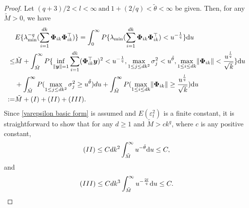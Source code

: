\documentclass[ejsv2]{imsart}
\theoremstyle{plain}
\theoremstyle{definition}
\theoremstyle{remark}
\begin{document}
\begin{proof}
Let $(q+3)/2<l<\infty\ \textrm{and}\ 1+(2/q)<\tilde{\theta}<\infty$ 
be given. Then, for any $\tilde{M}>0$, we have
\begin{equation}\label{pt.fisher.3}
\begin{split}
     & E\{\lambda_{\min}^{-q}(\sum_{i=1}^{dk}\bm{\Phi}_{ik}\bm{\Phi}_{ik}^\top)\} =   \int_{0}^{\infty}P\{\lambda_{\min}(\sum_{i=1}^{dk}\bm{\Phi}_{ik}\bm{\Phi}_{ik}^\top)<u^{-\frac{1}{q}}\}\mathrm{d}u \\
    \leq & \tilde{M}+\int_{\tilde{M}}^{\infty}P\{\inf\limits_{\lVert \bm{y}\rVert=1}\sum_{i=1}^{dk}(\bm{\Phi}_{ik}^\top\bm{y})^2<u^{-\frac{1}{q}},
   \max\limits_{1\leq j\leq dk^2}\sigma_j^2<u^{\tilde{\theta}},\max\limits_{1\leq i\leq dk}\lVert\bm{\Phi}_{ik}\rVert<\frac{u^{\frac{l}{q}}}{\sqrt{k}}\}\mathrm{d}u \\
     & +\int_{\tilde{M}}^{\infty}P(\max\limits_{1\leq j\leq dk^2}\sigma_j^2\geq u^{\tilde{\theta}})du+\int_{\tilde{M}}^{\infty}P({\max\limits_{1\leq i\leq dk}\lVert\bm{\Phi}_{ik}\rVert\geq \frac{u^{\frac{l}{q}}}{\sqrt{k}}})\mathrm{d}u \\
    := & \tilde{M}+{\rm (I)+(II)+(III)}.
\end{split}
\end{equation}
Since \eqref{varepsilon basic form} is assumed and $E(\varepsilon_t^2)$ is a finite constant, 
it is straightforward to show
that 
for any $d\geq 1$ and  $\tilde{M}>ck^q$,
where $c$ is any positive constant, 
\begin{equation}\label{pt.fisher.4}
{\rm (II)}\leq C dk^2\int_{\tilde{M}}^{\infty}u^{-{\tilde{\theta}}}\mathrm{d}u\leq C,
\end{equation}
and
\begin{equation}\label{pt.fisher.5}
{\rm (III)}\leq C dk^3\int_{\tilde{M}}^{\infty}u^{-\frac{2l}{q}}\mathrm{d}u\leq C.
\end{equation}


\end{proof}
\end{document}
